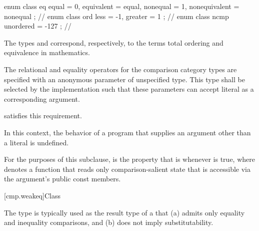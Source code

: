 \begin{codeblock}
enum class eq { equal = 0, equivalent = equal,
                nonequal = 1, nonequivalent = nonequal };   // \expos
enum class ord { less = -1, greater = 1 };                  // \expos
enum class ncmp { unordered = -127 };                       // \expos
\end{codeblock}

\pnum
\begin{note}
The types  and 
correspond, respectively, to the terms
total ordering and equivalence in mathematics.
\end{note}

\pnum
The relational and equality operators for the comparison category types
are specified with an anonymous parameter of unspecified type.
This type shall be selected by the implementation such that
these parameters can accept literal  as a corresponding argument.
\begin{example}
satisfies this requirement.
\end{example}
In this context, the behavior of a program that supplies
an argument other than a literal  is undefined.

\pnum
For the purposes of this subclause,
 is the property that  is 
whenever  is true,
where  denotes a function that reads only comparison-salient state
that is accessible via the argument's public const members.

[cmp.weakeq]{Class }

\pnum
The  type is typically used
as the result type of a 
that (a) admits only equality and inequality comparisons,
and (b) does not imply substitutability.

